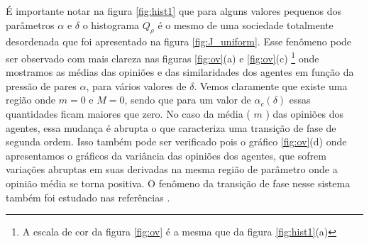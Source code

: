 É importante notar na figura \ref{fig:hist1} que para alguns valores
pequenos dos parâmetros $\alpha$ e $\delta$ o histograma $Q_\rho$ é
o mesmo de uma sociedade totalmente desordenada que foi apresentado na
figura \ref{fig:J_uniform}. Esse fenômeno pode ser observado com mais
clareza nas figuras \ref{fig:ov}(a) e \ref{fig:ov}(c) \footnote{A escala
de cor da figura \ref{fig:ov} é a mesma que da figura \ref{fig:hist1}(a)}
onde mostramos as médias das opiniões e das similaridades dos agentes em
função da pressão de pares $\alpha$, para vários valores de $\delta$. Vemos
claramente que existe uma região onde $m=0$ e $M=0$, sendo que para um valor
de $\alpha_c(\delta)$ essas quantidades ficam maiores que zero. No caso da
média ( $m$ ) das opiniões dos agentes, essa mudança é abrupta o que
caracteriza uma transição de fase de segunda ordem. Isso também pode ser
verificado pois o gráfico \ref{fig:ov}(d) onde apresentamos o gráficos
da variância das opiniões dos agentes, que sofrem variações abruptas
em suas derivadas na mesma região de parâmetro onde a opinião média se
torna positiva. O fenômeno da transição de fase nesse sistema também
foi estudado nas referências \citep{Caticha2011a,Susemihl2010}.

